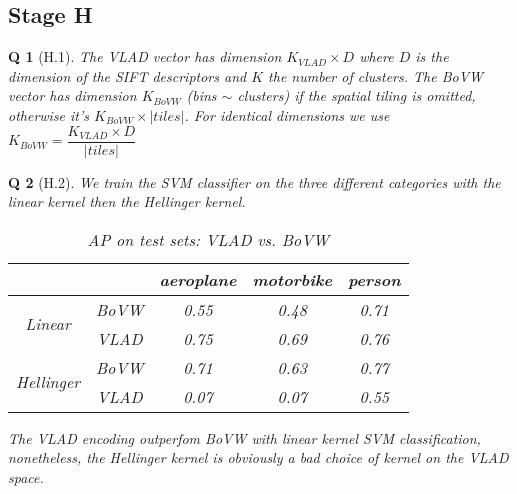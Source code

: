 \documentclass[11pt]{article}
\theoremstyle{exo}
\newtheorem*{exercise}{Q}
\newcommand{\1}{\mathbf{1}}
\newcommand{\0}{\mathbf{0}}
\begin{document}
\subsection*{Stage H}
\begin{exercise}[H.1]
	The VLAD vector has dimension $K_{VLAD}\times D$ where $D$ is the dimension of the SIFT descriptors and $K$ the number of clusters. The BoVW vector has dimension $K_{BoVW}$ (bins $\sim$ clusters) if the spatial tiling is omitted, otherwise it's $K_{BoVW}\times|tiles|$. For identical dimensions we use $K_{BoVW}=\dfrac{K_{VLAD}\times D}{|tiles|}$ 
\end{exercise}

\begin{exercise}[H.2]
	We train the SVM classifier on the three different categories with the linear kernel then the Hellinger kernel. 
	\begin{table}[H]
		\centering
		\caption{AP on test sets: VLAD vs. BoVW}
		\begin{tabular}{|c|c|c|c|c|}
		\cline{3-5}
		\multicolumn{2}{c|}{} & aeroplane & motorbike & person\\
		\hline
		\multirow{2}{*}{Linear} & BoVW & 0.55 & 0.48 & 0.71\\
		\cline{2-5}
		&VLAD & 0.75 & 0.69 & 0.76\\
		\hline
		\hline
		\multirow{2}{*}{Hellinger} & BoVW & 0.71 & 0.63 & 0.77\\
		\cline{2-5}
		&VLAD & 0.07 & 0.07 &0.55\\
		\hline
		\end{tabular}
	\end{table}
	The VLAD encoding outperfom BoVW with linear kernel SVM classification, nonetheless, the Hellinger kernel is obviously a bad choice of kernel on the VLAD space.
\end{exercise}
\end{document}

